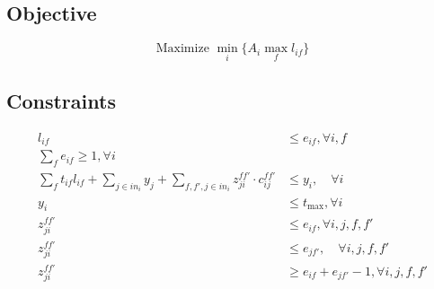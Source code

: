 \documentclass{article}
\begin{document}
\subsection*{Objective}
\begin{equation}
    \text{Maximize } \min_i \{A_i \max_f l_{if} \} \label{eq:obj2}
\end{equation}
\subsection*{Constraints}
\begin{align}
    l_{if} &\leq e_{if}, \forall i, f \label{eq:run-flag-multi} \\ 
    \sum_f e_{if} \geq 1, \forall i \label{eq:multi-fog-exact} \\  %
    \sum_f t_{if} l_{if} + 
    \sum_{j \in in_i} y_j + 
    \sum_{f, f', j \in in_i} z_{ji}^{ff'} \cdot c_{ij}^{ff'} &\leq y_i, \quad \forall i \label{eq:time-rest-multi} \\
    y_i &\leq t_{\max}, \forall i \\
    z_{ji}^{ff'} &\leq e_{if}, \forall i, j, f, f' \label{eq:z-e-if-multi} \\
    z_{ji}^{ff'} &\leq e_{jf'}, \quad \forall i, j, f, f' \label{eq:z-e-jf-multi} \\
    z_{ji}^{ff'} &\geq e_{if} + e_{jf'} - 1, \forall i, j, f, f' \label{eq:z-linearization-multi} 
\end{align}
\end{document}
